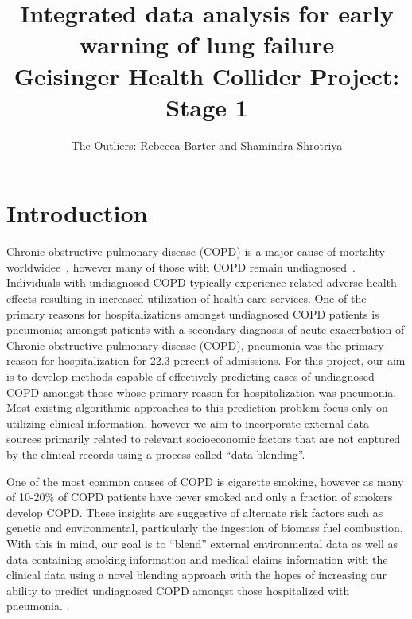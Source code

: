 \documentclass{article}
\title{Integrated data analysis for early warning of lung failure \\ \large{Geisinger Health Collider Project: Stage 1}}
\author{The Outliers: Rebecca Barter and Shamindra Shrotriya}
\begin{document}
\maketitle


\section{Introduction}

Chronic obstructive pulmonary disease (COPD) is a major cause of mortality worldwidee~\cite{lozano_global_2012}, however many of those with COPD remain undiagnosed~\cite{nih_chronic_2010}. Individuals with undiagnosed COPD typically experience related adverse health effects resulting in increased utilization of health care services. One of the primary reasons for hospitalizations amongst undiagnosed COPD patients is pneumonia; amongst patients with a secondary diagnosis of acute exacerbation of Chronic obstructive pulmonary disease (COPD), pneumonia was the primary reason for hospitalization for 22.3 percent of admissions. For this project, our aim is to develop methods capable of effectively predicting cases of undiagnosed COPD amongst those whose primary reason for hospitalization was pneumonia. Most existing algorithmic approaches to this prediction problem focus only on utilizing clinical information, however we aim to incorporate external data sources primarily related to relevant socioeconomic factors that are not captured by the clinical records using a process called ``data blending''. 

One of the most common causes of COPD is cigarette smoking, however as many of 10-20\% of COPD patients have never smoked and only a fraction of smokers develop COPD. These insights are suggestive of alternate risk factors such as genetic and environmental, particularly the ingestion of biomass fuel combustion. With this in mind, our goal is to ``blend'' external environmental data as well as data containing smoking information and medical claims information with the clinical data using a novel blending approach with the hopes of increasing our ability to predict undiagnosed COPD amongst those hospitalized with pneumonia. . 

%
\end{document}
